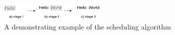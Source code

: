 \documentclass[]{sigchi}
\begin{document}


\begin{figure}[t]
\begin{center}
\includegraphics[width=0.45\textwidth]{figures/helloworld}
\caption{A demonstrating example of the scheduling algorithm}
\label{fig:drawing}
\end{center}
\end{figure}














\end{document}
